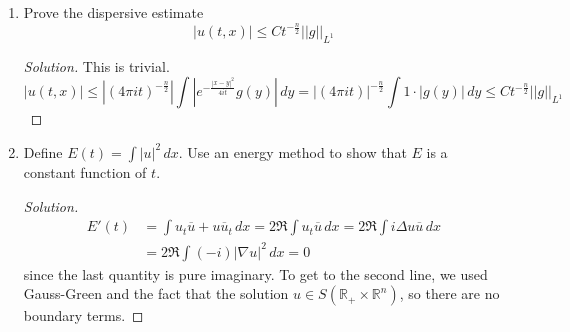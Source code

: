 \documentclass[12pt]{article}
\newenvironment{solution}{\begin{proof}[Solution]}{\end{proof}}
\begin{document}
\begin{enumerate}[label=(\alph*)]
\begin{solution}
			as desired. This is a \textit{derivation}. To actually show that this candidate solves the IVP, we have to go through the usual steps to justify differentiation under the integral sign.
		\end{solution}
		\item Prove the dispersive estimate
		\[
			\left| u(t,x) \right|\leq C t^{-\frac{n}{2}}\left|\left|g \right|\right|_{L^1} 
		\]
		\begin{solution}
			This is trivial.
			\[
				\left| u(t,x) \right| \leq \left|(4\pi i t)^{-\frac{n}{2}}\right| \int \left|e^{-\frac{|x-y|^2}{4it}}g(y)\right| \,dy = |(4\pi i t)|^{-\frac{n}{2}}\int 1\cdot |g(y)|\,dy \leq C t^{-\frac{n}{2}}\left|\left|g \right|\right|_{L^1}
			\]
		\end{solution}
		\item Define $E(t)=\int |u|^2\,dx$. Use an energy method to show that $E$ is a constant function of $t$.
		\begin{solution}
			\begin{align*}
				E'(t) &= \int u_t \overline{u} + u \overline{u}_t\,dx = 2\Re \int u_t\overline{u}\,dx = 2\Re \int i\Delta u \overline{u}\,dx \\
				&= 2\Re \int (-i) |\nabla u|^2\,dx = 0
			\end{align*}
			since the last quantity is pure imaginary. To get to the second line, we used Gauss-Green and the fact that the solution $u\in S(\mathbb{R}_+\times \mathbb{R}^n)$, so there are no boundary terms.
			

\end{solution}
\end{enumerate}
\end{document}
